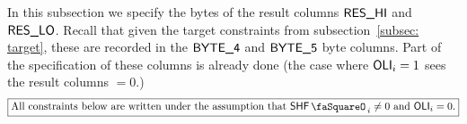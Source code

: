 In this subsection we specify the bytes of the result columns $\textsf{RES}\textsf{\_HI}$ and $\textsf{RES}\textsf{\_LO}$.
Recall that given the target constraints from subsection~\ref{subsec: target}, these are recorded in the $\textsf{BYTE}\textsf{\_4}$ and $\textsf{BYTE}\textsf{\_5}$ byte columns.
Part of the specification of these columns is already done (the case where $\textsf{OLI}_{i} = 1$ sees the result columns $=0$.)
\[
	\boxed{\text{All constraints below are written under the assumption that }\shfStamp_{i}\neq 0\text{ and }\oli_{i} = 0.}
\]

